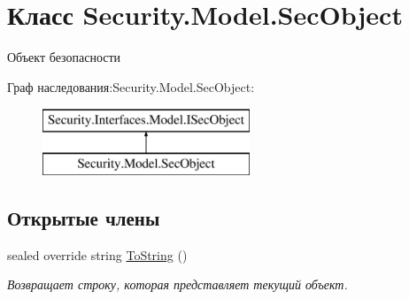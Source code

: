 \hypertarget{class_security_1_1_model_1_1_sec_object}{}\section{Класс Security.\+Model.\+Sec\+Object}
\label{class_security_1_1_model_1_1_sec_object}


Объект безопасности  


Граф наследования\+:Security.\+Model.\+Sec\+Object\+:\begin{figure}[H]
\begin{center}
\leavevmode
\includegraphics[height=2.000000cm]{de/d7f/class_security_1_1_model_1_1_sec_object}
\end{center}
\end{figure}
\subsection*{Открытые члены}
\begin{DoxyCompactItemize}
\item 
sealed override string \hyperlink{class_security_1_1_model_1_1_sec_object_aa5e3010bbd95a03eeb015c4a54eb003e}{To\+String} ()
\begin{DoxyCompactList}\small\item\em Возвращает строку, которая представляет текущий объект. \end{DoxyCompactList}\end{DoxyCompactItemize}
